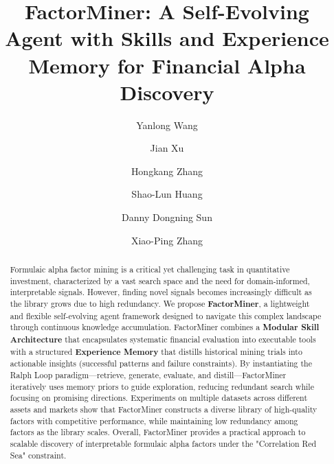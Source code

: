 \documentclass[sigconf]{acmart}
\begin{document}
\raggedbottom

\title{FactorMiner: A Self-Evolving Agent with Skills and Experience Memory for Financial Alpha Discovery}

\author{Yanlong Wang}

\author{Jian Xu}

\author{Hongkang Zhang}

\author{Shao-Lun Huang}

\author{Danny Dongning Sun}

\author{Xiao-Ping Zhang}

\renewcommand{\shortauthors}{Wang et al.}

\begin{abstract}
  Formulaic alpha factor mining is a critical yet challenging task in quantitative investment, characterized by a vast search space and the need for domain-informed, interpretable signals. However, finding novel signals becomes increasingly difficult as the library grows due to high redundancy. We propose \textbf{FactorMiner}, a lightweight and flexible self-evolving agent framework designed to navigate this complex landscape through continuous knowledge accumulation. FactorMiner combines a \textbf{Modular Skill Architecture} that encapsulates systematic financial evaluation into executable tools with a structured \textbf{Experience Memory} that distills historical mining trials into actionable insights (successful patterns and failure constraints). By instantiating the Ralph Loop paradigm---retrieve, generate, evaluate, and distill---FactorMiner iteratively uses memory priors to guide exploration, reducing redundant search while focusing on promising directions. Experiments on multiple datasets across different assets and markets show that FactorMiner constructs a diverse library of high-quality factors with competitive performance, while maintaining low redundancy among factors as the library scales. Overall, FactorMiner provides a practical approach to scalable discovery of interpretable formulaic alpha factors under the "Correlation Red Sea" constraint.
\end{abstract}
\end{document}
